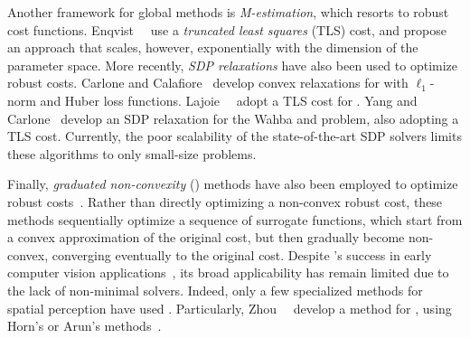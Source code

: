 Another framework for global methods is \emph{M-estimation}, which resorts to robust cost functions.
Enqvist~\etal~\cite{Enqvist12eccv-robustFitting} use a \textit{truncated least squares} (TLS) cost, and propose an approach that scales, however, exponentially with
the dimension of the parameter space. 
More recently, \emph{SDP relaxations} have also been used to optimize robust costs.  
 Carlone and Calafiore~\cite{Carlone18ral-robustPGO2D} develop convex relaxations for \PGO with $\ell_1$-norm and Huber loss functions. Lajoie~\etal~\cite{Lajoie19ral-DCGM} adopt a TLS cost for \PGO. 
Yang and Carlone~\cite{Yang19rss-teaser,Yang19iccv-QUASAR} develop an SDP relaxation for the Wahba and \PCR problem, also adopting a TLS cost. Currently, the poor scalability of the state-of-the-art SDP solvers limits these algorithms to only small-size problems.  

Finally, \textit{graduated non-convexity} (\GNC) methods have also been employed to optimize robust costs~\cite{Blake1987book-visualReconstruction}. 
Rather than directly optimizing a non-convex robust cost, 
these methods 
sequentially optimize a sequence of surrogate functions, which start from a convex approximation of the original cost, but then gradually become non-convex, converging eventually to the original cost. 
Despite \GNC's success in early computer vision applications~\cite{Black96ijcv-unification,Gold98}, its broad applicability has remain limited due to the lack of {non-minimal} solvers. Indeed, only a few specialized methods for spatial perception have used \GNC.
Particularly, Zhou~\etal~\cite{Zhou16eccv-fastGlobalRegistration} develop a method for \PCR, {using Horn's or Arun's methods~\cite{Horn87josa,Arun87pami}}.

